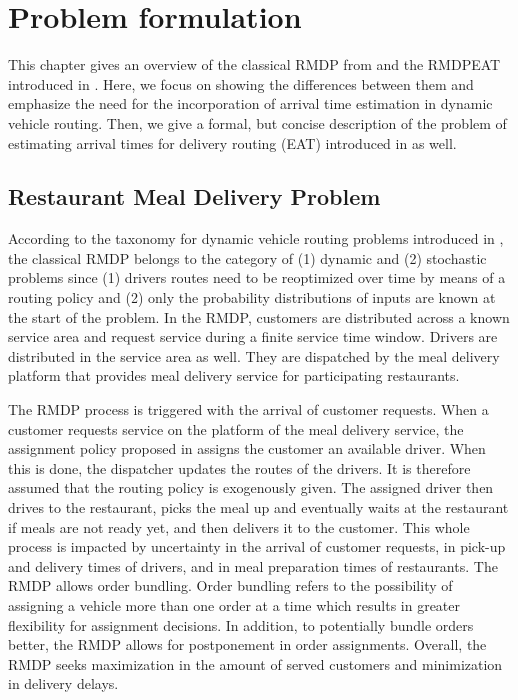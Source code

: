 \chapter{Problem formulation}\label{chap:prob}

This chapter gives an overview of the classical RMDP from \cite{UlmerRMDP} and the RMDPEAT introduced in \cite{Hildebrandt2020_EAT}. Here, we focus on showing the differences between them and emphasize the need for the incorporation of arrival time estimation in dynamic vehicle routing. Then, we give a formal, but concise description of the problem of estimating arrival times for delivery routing (EAT) introduced in \cite{Hildebrandt2020_EAT} as well. 
\section{Restaurant Meal Delivery Problem}

According to the taxonomy for dynamic vehicle routing problems introduced in \cite{psaraftis}, the classical RMDP belongs to the category of (1) dynamic and (2) stochastic problems since (1) drivers routes need to be reoptimized over time by means of a routing policy and (2) only the probability distributions of inputs are known at the start of the problem. In the RMDP, customers are distributed across a known service area and request service during a finite service time window. Drivers are distributed in the service area as well. They are dispatched by the meal delivery platform that provides meal delivery service for participating restaurants. 

The RMDP process is triggered with the arrival of customer requests. When a customer requests service on the platform of the meal delivery service, the assignment policy proposed in \cite{UlmerRMDP} assigns the customer an available driver. When this is done, the dispatcher updates the routes of the drivers. It is therefore assumed that the routing policy is exogenously given. The assigned driver then drives to the restaurant, picks the meal up and eventually waits at the restaurant if meals are not ready yet, and then delivers it to the customer. This whole process is impacted by uncertainty in the arrival of customer requests, in pick-up and delivery times of drivers, and in meal preparation times of restaurants.
The RMDP allows order bundling. Order bundling refers to the possibility of assigning a vehicle more than one order at a time which results in greater flexibility for assignment decisions. In addition, to potentially bundle orders better, the RMDP allows for postponement in order assignments.
Overall, the RMDP seeks maximization in the amount of served customers and minimization in delivery delays. 

